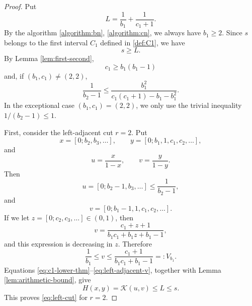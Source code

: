\documentclass[11pt]{amsart}
\newcommand{\Kfun}{\mathcal K}
\begin{document}
\begin{proof}
Put
$$
        L=\frac{1}{b_1}+\frac1{c_1+1}.
$$
By the algorithm \eqref{algorithm:bn}, \eqref{algorithm:cn}, we always have $b_1\ge2$.  Since $s$ belongs to the first interval $C_1$ defined in \eqref{def:C1}, we have
\begin{equation}\label{eq:s-lower-bound}
        s\ge L.
\end{equation}
By Lemma \ref{lem:first-second},
\begin{equation}\label{eq:c1-lower-thm}
        c_1\geq b_1(b_1-1)
\end{equation}
and, if $(b_1,c_1)\ne(2,2)$,
\begin{equation}\label{eq:b2-recip-bound}
        \frac1{b_2-1}
        \le
        \frac{b_1^2}{c_1(c_1+1)-b_1-b_1^2}.
\end{equation}
In the exceptional case $(b_1,c_1)=(2,2)$, we only use the trivial inequality
$1/(b_2-1)\le1$.

First, consider the left-adjacent cut $r=2$.  Put
$$
        x=[0;b_2,b_3,\ldots],
        \qquad
        y=[0;b_1,1,c_1,c_2,\ldots],
$$
and
$$
        u=\frac{x}{1-x},
        \qquad
        v=\frac{y}{1-y}.
$$
Then
\begin{equation}\label{eq:left-adjacent-u}
        u=[0;b_2-1,b_3,\ldots]
        \le \frac1{b_2-1},
\end{equation}
and
$$
        v=[0;b_1-1,1,c_1,c_2,\ldots].
$$
If we let $z=[0;c_2,c_3,\ldots]\in(0,1)$, then
$$
        v=\frac{c_1+z+1}{b_1c_1+b_1z+b_1-1},
$$
and this expression is decreasing in $z$.  Therefore
\begin{equation}\label{eq:left-adjacent-v}
        \frac{1}{b_1}\le v\le \frac{c_1+1}{b_1c_1+b_1-1}=:V_{b_1}.
\end{equation}
Equations \eqref{eq:c1-lower-thm}--\eqref{eq:left-adjacent-v}, together with Lemma \ref{lem:arithmetic-bound}, give
$$
        H(x,y)=\Kfun(u,v)\le L\le s.
$$
This proves \eqref{eq:left-cut} for $r=2$.


\end{proof}
\end{document}
